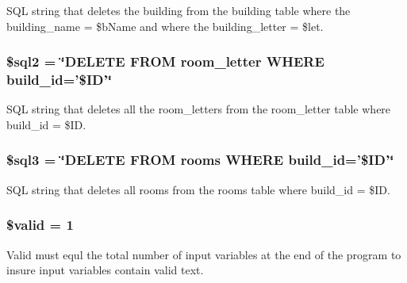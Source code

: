 \-S\-Q\-L string that deletes the building from the building table where the building\-\_\-name = \$b\-Name and where the building\-\_\-letter = \$let. \hypertarget{rmBuilding_8php_a1ad0ffe3fa0755e56a1a6bb40c232b8a}{
\subsubsection[{\$sql2}]{\setlength{\rightskip}{0pt plus 5cm}\$sql2 = \char`\"{}\-D\-E\-L\-E\-T\-E \-F\-R\-O\-M room\-\_\-letter \-W\-H\-E\-R\-E build\-\_\-id='\$\-I\-D'\char`\"{}}}\label{rmBuilding_8php_a1ad0ffe3fa0755e56a1a6bb40c232b8a}
\-S\-Q\-L string that deletes all the room\-\_\-letters from the room\-\_\-letter table where build\-\_\-id = \$\-I\-D. \hypertarget{rmBuilding_8php_af837618eb187a024f9473f6de320db84}{
\subsubsection[{\$sql3}]{\setlength{\rightskip}{0pt plus 5cm}\$sql3 = \char`\"{}\-D\-E\-L\-E\-T\-E \-F\-R\-O\-M rooms \-W\-H\-E\-R\-E build\-\_\-id='\$\-I\-D'\char`\"{}}}\label{rmBuilding_8php_af837618eb187a024f9473f6de320db84}
\-S\-Q\-L string that deletes all rooms from the rooms table where build\-\_\-id = \$\-I\-D. \hypertarget{rmBuilding_8php_a0587674d27d00ef497e08e53ccf45bbb}{
\subsubsection[{\$valid}]{\setlength{\rightskip}{0pt plus 5cm}\$valid = 1}}\label{rmBuilding_8php_a0587674d27d00ef497e08e53ccf45bbb}
\-Valid must equl the total number of input variables at the end of the program to insure input variables contain valid text. 